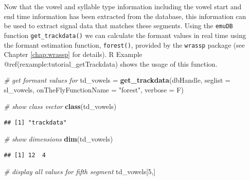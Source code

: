 \documentclass[]{book}
\newenvironment{Shaded}{\begin{snugshade}}{\end{snugshade}}
\newcommand{\KeywordTok}[1]{\textcolor[rgb]{0.13,0.29,0.53}{\textbf{{#1}}}}
\newcommand{\DataTypeTok}[1]{\textcolor[rgb]{0.13,0.29,0.53}{{#1}}}
\newcommand{\DecValTok}[1]{\textcolor[rgb]{0.00,0.00,0.81}{{#1}}}
\newcommand{\StringTok}[1]{\textcolor[rgb]{0.31,0.60,0.02}{{#1}}}
\newcommand{\CommentTok}[1]{\textcolor[rgb]{0.56,0.35,0.01}{\textit{{#1}}}}
\newcommand{\NormalTok}[1]{{#1}}
\theoremstyle{definition}
\theoremstyle{definition}
\theoremstyle{definition}
\theoremstyle{remark}
\begin{document}
Now that the vowel and syllable type information including the vowel
start and end time information has been extracted from the database,
this information can be used to extract signal data that matches these
segments. Using the \texttt{emuDB} function \texttt{get\_trackdata()} we
can calculate the formant values in real time using the formant
estimation function, \texttt{forest()}, provided by the \texttt{wrassp}
package (see Chapter \ref{chap:wrassp} for details). R Example
@ref(rexample:tutorial\_getTrackdata) shows the usage of this function.

\begin{Shaded}
\begin{Highlighting}[]
\CommentTok{# get formant values for}
\NormalTok{td_vowels =}\StringTok{ }\KeywordTok{get_trackdata}\NormalTok{(dbHandle,}
                          \DataTypeTok{seglist =} \NormalTok{sl_vowels,}
                          \DataTypeTok{onTheFlyFunctionName =} \StringTok{"forest"}\NormalTok{,}
                          \DataTypeTok{verbose =} \NormalTok{F)}

\CommentTok{# show class vector}
\KeywordTok{class}\NormalTok{(td_vowels)}
\end{Highlighting}
\end{Shaded}

\begin{verbatim}
## [1] "trackdata"
\end{verbatim}

\begin{Shaded}
\begin{Highlighting}[]
\CommentTok{# show dimensions}
\KeywordTok{dim}\NormalTok{(td_vowels)}
\end{Highlighting}
\end{Shaded}

\begin{verbatim}
## [1] 12  4
\end{verbatim}

\begin{Shaded}
\begin{Highlighting}[]
\CommentTok{# display all values for fifth segment}
\NormalTok{td_vowels[}\DecValTok{5}\NormalTok{,]}
\end{Highlighting}
\end{Shaded}
\end{document}
